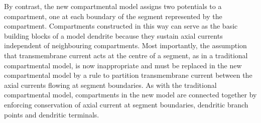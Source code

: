 By contrast, the new compartmental model assigns two potentials to
a compartment, one at each boundary of the segment represented by
the compartment. Compartments constructed in this way can serve as
the basic building blocks of a model dendrite because they sustain
axial currents independent of neighbouring compartments. Most
importantly, the assumption that transmembrane current acts at the
centre of a segment, as in a traditional compartmental model, is
now inappropriate and must be replaced in the new compartmental
model by a rule to partition transmembrane current between the
axial currents flowing at segment boundaries. As with the
traditional compartmental model, compartments in the new model are
connected together by enforcing conservation of axial current at
segment boundaries, dendritic branch points and dendritic
terminals.
